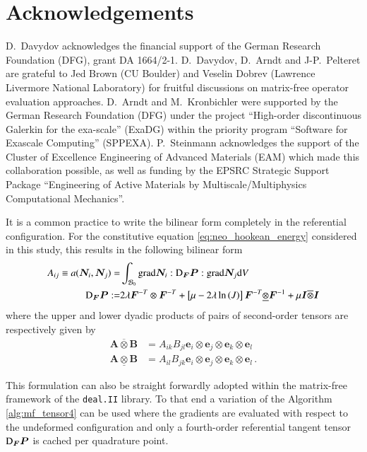 \documentclass[AMA,STIX1COL]{WileyNJD-v2}
\newcommand*{\gz}[1]{\boldsymbol{#1}}
\newcommand*{\grad}{\mathrm{grad}}
\renewcommand*{\d}{\mathrm{d}}
\newcommand*{\mcl}[1]{\mathcal{#1}}
\begin{document}
\section*{Acknowledgements}

D.~Davydov acknowledges the financial support of the German Research Foundation (DFG), grant DA 1664/2-1.
D.~Davydov, D.~Arndt and J-P.~Pelteret are grateful to Jed Brown (CU Boulder) and Veselin Dobrev (Lawrence Livermore National Laboratory) for fruitful discussions on matrix-free operator evaluation approaches.
D.~Arndt and M.~Kronbichler were supported by the German Research Foundation (DFG) under the project ``High-order discontinuous
Galerkin for the exa-scale'' (\mbox{ExaDG}) within the priority program ``Software
for Exascale Computing'' (SPPEXA).
P.~Steinmann acknowledges the support of the Cluster of Excellence Engineering of Advanced Materials (EAM) which made this collaboration possible, as well as funding by the EPSRC Strategic Support Package ``Engineering of Active Materials by Multiscale/Multiphysics Computational Mechanics''.

\appendix

{\color{red}
It is a common practice to write the bilinear form completely in the referential configuration. For the constitutive equation \eqref{eq:neo_hookean_energy} considered in this study, this results in the following bilinear form
}
\begin{align}
  A_{ij} \equiv a(\gz N_i, \gz N_j) =&
  \int_{\mcl B_0}
  \grad \gz N_i : {\rm D}_{\gz F}{\gz P} : \grad \gz N_j
  \d V
  \label{eq:algebraic_tangent_dPdF}
  \\
  {\rm D}_{\gz F}{\gz P} :=&
  2 \lambda
  \gz F^{-T} \otimes \gz F^{-T}
  +
  \left[\mu - 2 \lambda \ln\left( J \right) \right]
  \gz F^{-T} \underline{\otimes} \gz F^{-1}
  +
  \mu \gz I \overline{\otimes} \gz I
\end{align}
where the upper and lower dyadic products of pairs of second-order tensors are respectively given by
\begin{align*}
    \gz A \overline{\otimes} \gz B &= A_{ik} B_{jl} \gz e_i \otimes \gz e_j \otimes \gz e_k \otimes \gz e_l \\
    \gz A \underline{\otimes} \gz B &= A_{il} B_{jk} \gz e_i \otimes \gz e_j \otimes \gz e_k \otimes \gz e_l  \, .
\end{align*}

{\color{red}
This formulation can also be straight forwardly adopted within the matrix-free framework of the \texttt{deal.II} library.
To that end a variation of the Algorithm \ref{alg:mf_tensor4} can be used where the gradients are evaluated with respect to the undeformed configuration and only a fourth-order referential tangent tensor ${\rm D}_{\gz F}{\gz P}$ is cached per quadrature point.
}
\end{document}
